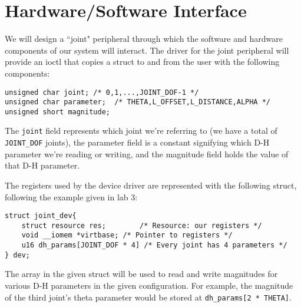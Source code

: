 \section{Hardware/Software Interface}

We will design a ``joint" peripheral through which the software and hardware components of our system will interact. 
The driver for the joint peripheral will provide an ioctl that copies a struct to and from the user with the following components:
\begin{verbatim}
unsigned char joint; /* 0,1,...,JOINT_DOF-1 */
unsigned char parameter;  /* THETA,L_OFFSET,L_DISTANCE,ALPHA */ 
unsigned short magnitude; 
\end{verbatim}
The \texttt{joint} field represents which joint we're referring to (we have a total of \texttt{JOINT\_DOF} joints), the parameter field
is a constant signifying which D-H parameter we're reading or writing, and the magnitude field holds the value of that D-H parameter.

The registers used by the device driver are represented with the following struct, following the example given in lab 3:

\begin{verbatim}
struct joint_dev{
	struct resource res;		/* Resource: our registers */
	void __iomem *virtbase; /* Pointer to registers */
	u16 dh_params[JOINT_DOF * 4] /* Every joint has 4 parameters */
} dev;
\end{verbatim}

The array in the given struct will be used to read and write magnitudes for various D-H parameters in the given configuration. For example,
the magnitude of the third joint's theta parameter would be stored at \texttt{dh\_params[2 * THETA]}.


